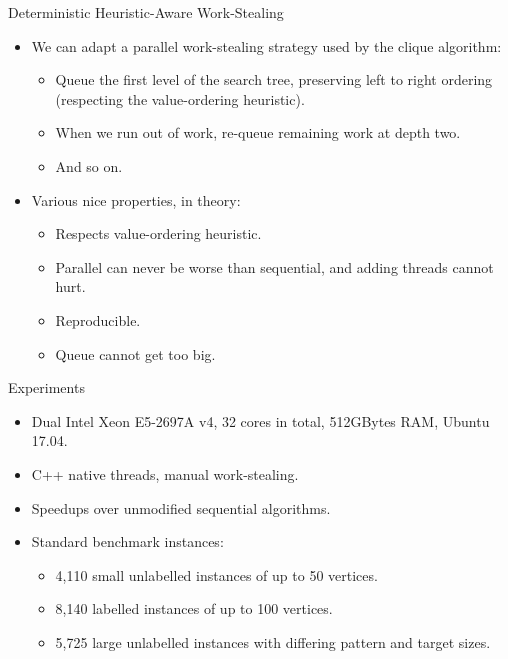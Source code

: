 \documentclass{beamer}
\begin{document}
\begin{frame}{Deterministic Heuristic-Aware Work-Stealing}
    \begin{itemize}
        \item We can adapt a parallel work-stealing strategy used by the clique algorithm:
            \begin{itemize}
                \item Queue the first level of the search tree, preserving left to right ordering
                    (respecting the value-ordering heuristic).
                \item When we run out of work, re-queue remaining work at depth two.
                \item And so on.
            \end{itemize}
        \item Various nice properties, in theory:
            \begin{itemize}
                \item Respects value-ordering heuristic.
                \item Parallel can never be worse than sequential, and adding threads cannot hurt.
                \item Reproducible.
                \item Queue cannot get too big.
            \end{itemize}
    \end{itemize}
\end{frame}

\begin{frame}{Experiments}
    \begin{itemize}
        \item Dual Intel Xeon E5-2697A v4, 32 cores in total, 512GBytes RAM, Ubuntu 17.04.
        \item C++ native threads, manual work-stealing.
        \item Speedups over unmodified sequential algorithms.
        \item Standard benchmark instances:
            \begin{itemize}
                \item 4,110 small unlabelled instances of up to 50 vertices.
                \item 8,140 labelled instances of up to 100 vertices.
                \item 5,725 large unlabelled instances with differing pattern and target sizes.
            \end{itemize}
    \end{itemize}
\end{frame}
\end{document}
